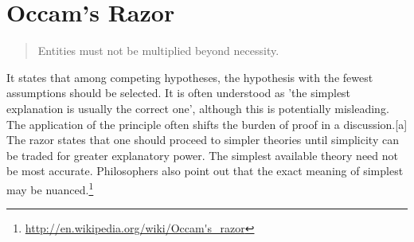 \section{Occam's Razor}
\begin{quotation}
Entities must not be multiplied beyond necessity.\end{quotation}
 It states that among competing hypotheses, the hypothesis with the fewest assumptions should be selected. It is often understood as 'the simplest explanation is usually the correct one', although this is potentially misleading.
The application of the principle often shifts the burden of proof in a discussion.[a] The razor states that one should proceed to simpler theories until simplicity can be traded for greater explanatory power. The simplest available theory need not be most accurate. Philosophers also point out that the exact meaning of simplest may be nuanced.\footnote{\url{http://en.wikipedia.org/wiki/Occam's_razor}}

